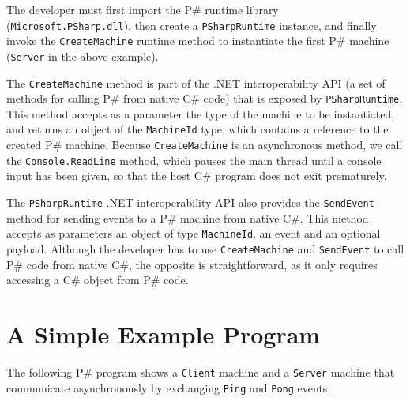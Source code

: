 \documentclass{llncs}
\newcommand{\ps}{P\#\xspace}
\newcommand{\cs}{C\#\xspace}
\begin{document}
\noindent
The developer must first import the \ps runtime library (\texttt{Microsoft.PSharp.dll}), then create a \texttt{PSharpRuntime} instance, and finally invoke the \texttt{CreateMachine} runtime method to instantiate the first \ps machine (\texttt{Server} in the above example).

The \texttt{CreateMachine} method is part of the .NET interoperability API (a set of methods for calling \ps from native \cs code) that is exposed by \texttt{PSharpRuntime}. This method accepts as a parameter the type of the machine to be instantiated, and returns an object of the \texttt{MachineId} type, which contains a reference to the created \ps machine. Because \texttt{CreateMachine} is an asynchronous method, we call the \texttt{Console.ReadLine} method, which pauses the main thread until a console input has been given, so that the host \cs program does not exit prematurely.

The \texttt{PSharpRuntime} .NET interoperability API also provides the \texttt{SendEvent} method for sending events to a \ps machine from native \cs. This method accepts as parameters an object of type \texttt{MachineId}, an event and an optional payload. Although the developer has to use \texttt{CreateMachine} and \texttt{SendEvent} to call \ps code from native \cs, the opposite is straightforward, as it only requires accessing a \cs object from \ps code.

\section{A Simple Example Program}
\label{sec:example}

The following \ps program shows a \texttt{Client} machine and a \texttt{Server} machine that communicate asynchronously by exchanging \texttt{Ping} and \texttt{Pong} events:
\end{document}
